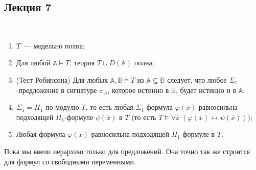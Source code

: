 \subsection{Лекция 7}

\begin{theorem} \  

    \begin{enumerate}
        \item $T$~— модельно полна; 
        \item Для любой $\mathbb{A} \models T$, теория $T \cup D(\mathbb{A})$ полна; 
        \item (Тест Робинсона) Для любых $\mathbb{A}, \mathbb{B} \models T$ из $\mathbb{A} \subseteq \mathbb{B}$ следует, что любое $\Sigma_1$-предложение в сигнатуре $\sigma_A$, которое истинно в $\mathbb{B}$, будет истинно и в $\mathbb{A}$; 
        \item $\Sigma_1 = \Pi_1$ по модулю $T$, то есть любая $\Sigma_1$-формула $\varphi(\overline{x})$ равносильна подходящей $\Pi_1$-формуле $\psi(\overline{x})$ в $T$ (то есть $T \models \forall \overline{x}~(\varphi(\overline{x}) \leftrightarrow \psi (\overline{x}))$); 
        \item Любая формула $\varphi(\overline{x})$ равносильна подходящей $\Pi_1$-формуле в $T$.
    \end{enumerate}
\end{theorem}

\begin{remark}
    Пока мы ввели иерархию только для предложений. Она точно так же строится для формул со свободными переменными.
\end{remark}

